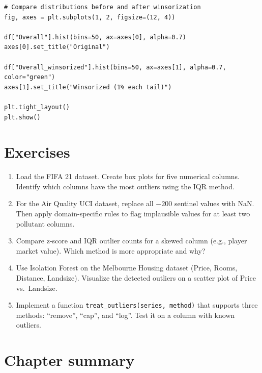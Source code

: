 \begin{verbatim}
# Compare distributions before and after winsorization
fig, axes = plt.subplots(1, 2, figsize=(12, 4))

df["Overall"].hist(bins=50, ax=axes[0], alpha=0.7)
axes[0].set_title("Original")

df["Overall_winsorized"].hist(bins=50, ax=axes[1], alpha=0.7, color="green")
axes[1].set_title("Winsorized (1% each tail)")

plt.tight_layout()
plt.show()
\end{verbatim}

\section{Exercises}

\begin{exercise}
\begin{enumerate}
  \item Load the FIFA 21 dataset. Create box plots for five numerical columns. Identify which columns have the most outliers using the IQR method.
  \item For the Air Quality UCI dataset, replace all $-200$ sentinel values with NaN. Then apply domain-specific rules to flag implausible values for at least two pollutant columns.
  \item Compare z-score and IQR outlier counts for a skewed column (e.g., player market value). Which method is more appropriate and why?
  \item Use Isolation Forest on the Melbourne Housing dataset (Price, Rooms, Distance, Landsize). Visualize the detected outliers on a scatter plot of Price vs.\ Landsize.
  \item Implement a function \texttt{treat\_outliers(series, method)} that supports three methods: ``remove'', ``cap'', and ``log''. Test it on a column with known outliers.
\end{enumerate}
\end{exercise}

\section{Chapter summary}

